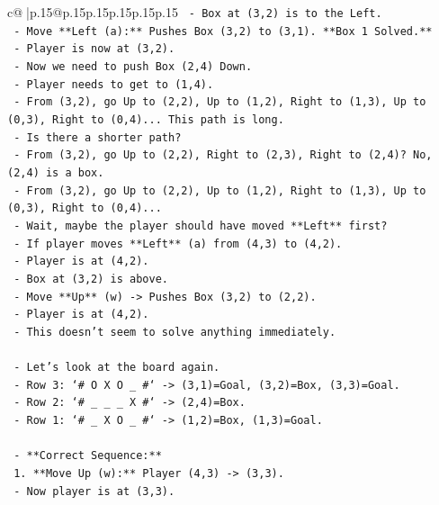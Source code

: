 \documentclass{article}
\begin{document}
{\begin{supertabular}{c@{$\;$}|p{.15\linewidth}@{}p{.15\linewidth}p{.15\linewidth}p{.15\linewidth}p{.15\linewidth}p{.15\linewidth}}
{{{\texttt{            {-} Box at (3,2) is to the Left.} \\
\texttt{            {-} Move **Left (a):** Pushes Box (3,2) to (3,1). **Box 1 Solved.**} \\
\texttt{            {-} Player is now at (3,2).} \\
\texttt{            {-} Now we need to push Box (2,4) Down.} \\
\texttt{            {-} Player needs to get to (1,4).} \\
\texttt{            {-} From (3,2), go Up to (2,2), Up to (1,2), Right to (1,3), Up to (0,3), Right to (0,4)... This path is long.} \\
\texttt{            {-} Is there a shorter path?} \\
\texttt{            {-} From (3,2), go Up to (2,2), Right to (2,3), Right to (2,4)? No, (2,4) is a box.} \\
\texttt{            {-} From (3,2), go Up to (2,2), Up to (1,2), Right to (1,3), Up to (0,3), Right to (0,4)...} \\
\texttt{            {-} Wait, maybe the player should have moved **Left** first?} \\
\texttt{            {-} If player moves **Left** (a) from (4,3) to (4,2).} \\
\texttt{                {-} Player is at (4,2).} \\
\texttt{                {-} Box at (3,2) is above.} \\
\texttt{                {-} Move **Up** (w) {-}> Pushes Box (3,2) to (2,2).} \\
\texttt{                {-} Player is at (4,2).} \\
\texttt{                {-} This doesn't seem to solve anything immediately.} \\
\\ 
\texttt{    {-} Let's look at the board again.} \\
\texttt{    {-} Row 3: `\# O X O \_ \#` {-}> (3,1)=Goal, (3,2)=Box, (3,3)=Goal.} \\
\texttt{    {-} Row 2: `\# \_ \_ \_ X \#` {-}> (2,4)=Box.} \\
\texttt{    {-} Row 1: `\# \_ X O \_ \#` {-}> (1,2)=Box, (1,3)=Goal.} \\
\\ 
\texttt{    {-} **Correct Sequence:**} \\
\texttt{        1.  **Move Up (w):** Player (4,3) {-}> (3,3).} \\
\texttt{            {-} Now player is at (3,3).} \\
}}}
\end{supertabular}}
\end{document}
